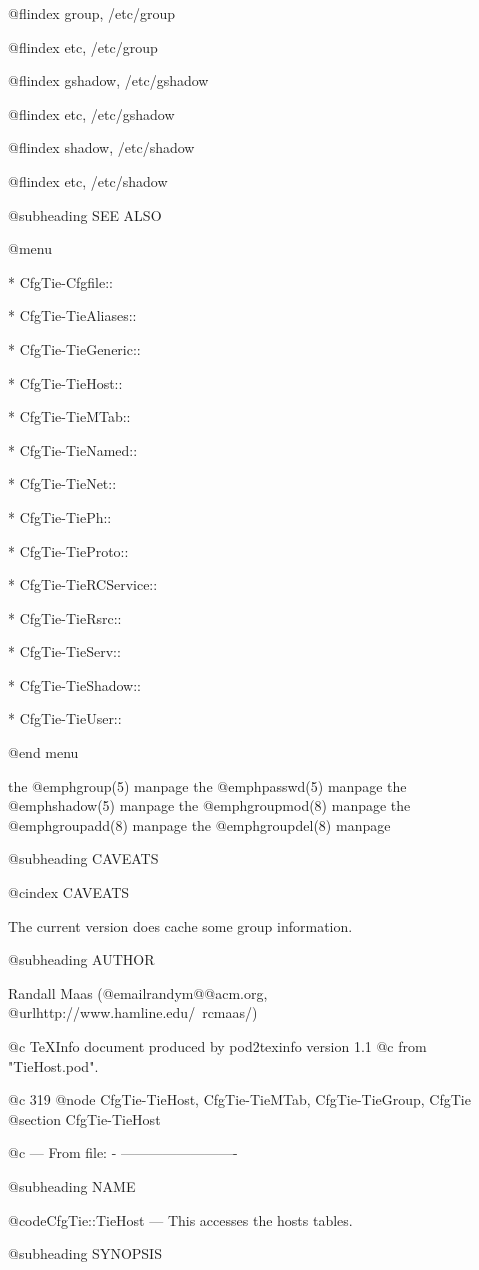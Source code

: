 {{{{{{{@flindex group, /etc/group

@flindex etc, /etc/group

@flindex gshadow, /etc/gshadow

@flindex etc, /etc/gshadow

@flindex shadow, /etc/shadow

@flindex etc, /etc/shadow

@subheading SEE ALSO


@menu

* CfgTie-Cfgfile::	
      
* CfgTie-TieAliases::	
 
* CfgTie-TieGeneric::	


* CfgTie-TieHost::	
      
* CfgTie-TieMTab::	
    
* CfgTie-TieNamed::	


* CfgTie-TieNet::	
       
* CfgTie-TiePh::	
      
* CfgTie-TieProto::	


* CfgTie-TieRCService::	
 
* CfgTie-TieRsrc::	
    
* CfgTie-TieServ::	


* CfgTie-TieShadow::	
    
* CfgTie-TieUser::	


@end menu

the @emph{group}(5) manpage
the @emph{passwd}(5) manpage
the @emph{shadow}(5) manpage
the @emph{groupmod}(8) manpage
the @emph{groupadd}(8) manpage
the @emph{groupdel}(8) manpage

@subheading CAVEATS

@cindex CAVEATS

The current version does cache some group information.

@subheading AUTHOR

Randall Maas (@email{randym@@acm.org}, @url{http://www.hamline.edu/~rcmaas/})

@c TeXInfo document produced by pod2texinfo version 1.1
@c from "TieHost.pod".


@c 319
@node CfgTie-TieHost, CfgTie-TieMTab, CfgTie-TieGroup, CfgTie
@section CfgTie-TieHost


@c --- From file: - -------------------------

@subheading NAME


@code{CfgTie::TieHost} --- This accesses the hosts tables.

@subheading SYNOPSIS

}}}}}}}
